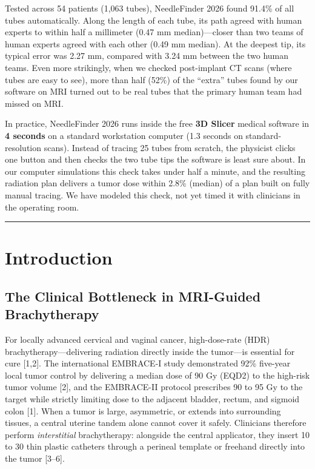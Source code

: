 \documentclass[
  11pt,
]{article}
\begin{document}
Tested across 54 patients (1,063 tubes), NeedleFinder 2026 found 91.4\%
of all tubes automatically. Along the length of each tube, its path
agreed with human experts to within half a millimeter (0.47 mm
median)---closer than two teams of human experts agreed with each other
(0.49 mm median). At the deepest tip, its typical error was 2.27 mm,
compared with 3.24 mm between the two human teams. Even more strikingly,
when we checked post-implant CT scans (where tubes are easy to see),
more than half (52\%) of the ``extra'' tubes found by our software on
MRI turned out to be real tubes that the primary human team had missed
on MRI.

In practice, NeedleFinder 2026 runs inside the free \textbf{3D Slicer}
medical software in \textbf{4 seconds} on a standard workstation
computer (1.3 seconds on standard-resolution scans). Instead of tracing
25 tubes from scratch, the physicist clicks one button and then checks
the two tube tips the software is least sure about. In our computer
simulations this check takes under half a minute, and the resulting
radiation plan delivers a tumor dose within 2.8\% (median) of a plan
built on fully manual tracing. We have modeled this check, not yet timed
it with clinicians in the operating room.

\begin{center}\rule{0.5\linewidth}{0.5pt}\end{center}

\section{Introduction}\label{introduction}

\subsection{The Clinical Bottleneck in MRI-Guided
Brachytherapy}\label{the-clinical-bottleneck-in-mri-guided-brachytherapy}

For locally advanced cervical and vaginal cancer, high-dose-rate (HDR)
brachytherapy---delivering radiation directly inside the tumor---is
essential for cure {[}1,2{]}. The international EMBRACE-I study
demonstrated 92\% five-year local tumor control by delivering a median
dose of 90 Gy (EQD2) to the high-risk tumor volume {[}2{]}, and the
EMBRACE-II protocol prescribes 90 to 95 Gy to the target while strictly
limiting dose to the adjacent bladder, rectum, and sigmoid colon
{[}1{]}. When a tumor is large, asymmetric, or extends into surrounding
tissues, a central uterine tandem alone cannot cover it safely.
Clinicians therefore perform \emph{interstitial} brachytherapy:
alongside the central applicator, they insert 10 to 30 thin plastic
catheters through a perineal template or freehand directly into the
tumor {[}3--6{]}.
\end{document}

